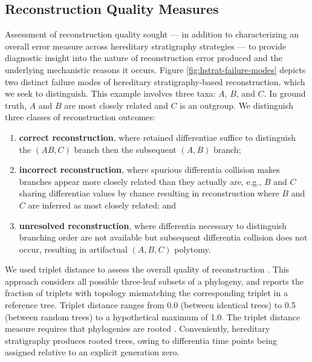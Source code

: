 \subsection{Reconstruction Quality Measures}



Assessment of reconstruction quality sought --- in addition to characterizing an overall error measure across hereditary stratigraphy strategies --- to provide diagnostic insight into the nature of reconstruction error produced and the underlying mechanistic reasons it occurs.
Figure \ref{fig:hstrat-failure-modes} depicts two distinct failure modes of hereditary stratigraphy-based reconstruction, which we seek to distinguish.
This example involves three taxa: $A$, $B$, and $C$.
In ground truth, $A$ and $B$ are most closely related and $C$ is an outgroup.
We distinguish three classes of reconstruction outcomes:
\begin{enumerate}
\item \textbf{correct reconstruction}, where retained differentiae suffice to distinguish the $(AB,C)$ branch then the subsequent $(A,B)$ branch;
\item \textbf{incorrect reconstruction}, where spurious differentia collision makes branches appear more closely related than they actually are, e.g., $B$ and $C$ sharing differentiae values by chance resulting in reconstruction where $B$ and $C$ are inferred as most closely related; and
\item \textbf{unresolved reconstruction}, where differentia necessary to distinguish branching order are not available but subsequent differentia collision does not occur, resulting in artifactual $(A,B,C)$ polytomy.
\end{enumerate}

We used triplet distance to assess the overall quality of reconstruction \citep{critchlow1996triples}.
This approach considers all possible three-leaf subsets of a phylogeny, and reports the fraction of triplets with topology mismatching the corresponding triplet in a reference tree.
Triplet distance ranges from 0.0 (between identical trees) to 0.5 (between random trees) to a hypothetical maximum of 1.0.
The triplet distance measure requires that phylogenies are rooted \citep{estabrook1985comparison}.
Conveniently, hereditary stratigraphy produces rooted trees, owing to differentia time points being assigned relative to an explicit generation zero.


